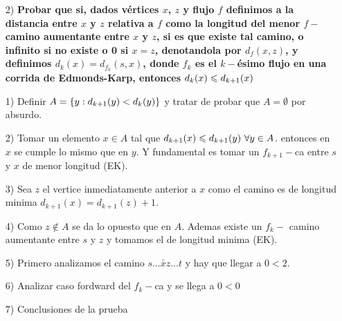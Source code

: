 \documentclass[12pt,a4paper]{article}
\begin{document}
\begin{itemize}
    \item [2)] \textbf{Probar que si, dados vértices $x$, $z$ y flujo $f$ definimos a la distancia 
    entre $x$ y $z$ relativa a $f$ como la longitud del menor $f-$camino aumentante 
    entre $x$ y $z$, si es que existe tal camino, o infinito si no existe o 0 
    si $x = z$, denotandola por $d_{f} (x, z)$, y definimos 
    $d_{k}(x) = d_{f_{k}} (s, x)$, donde $f_{k}$ es el $k-$ésimo flujo en una 
    corrida de Edmonds-Karp, entonces $d_{k}(x) \leqslant d_{k+1}(x)$}
    \label{dem:dist}
\end{itemize}
\begin{itemize}
    \item [1)] Definir $A = \left\lbrace y:d_{k+1}(y) < d_{k}(y) \right\rbrace$ y tratar de probar que 
        $A = \emptyset$ por absurdo.
    \item [2)] Tomar un elemento $x \in A$ tal que $d_{k+1}(x) \leqslant d_{k+1}(y)\,\, \forall y \in A$.
        entonces en $x$ se cumple lo mismo que en $y$. Y fundamental es tomar un 
        $f_{k+1}-$ca entre $s$ y $x$ de menor longitud (EK).
    \item [3)] Sea $z$ el vertice inmediatamente anterior a $x$ como el camino es de 
        longitud minima $d_{k+1}(x) = d_{k+1}(z) +1$.
    \item [4)] Como $z \notin A$ se da lo opuesto que en $A$. Ademas existe un $f_{k}-$
        camino aumentante entre $s$ y $z$ y tomamos el de longitud minima (EK).
    \item [5)] Primero analizamos el camino $s\ldots \overleftarrow{xz} \ldots t$ 
        y hay que llegar a $0 < 2$.
    \item [6)] Analizar caso fordward del $f_{k}-$ca y se llega a $0<0$
    \item [7)] Conclusiones de la prueba
\end{itemize}
\end{document}
